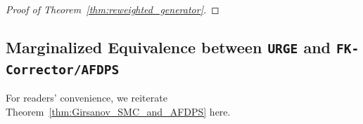 \documentclass{article}
\theoremstyle{plain}
\theoremstyle{definition}
\theoremstyle{remark}
\renewcommand{\P}{{\mathbb{P}}}
\begin{document}
\begin{proof}[Proof of Theorem~\ref{thm:reweighted_generator}]

\end{proof}

\subsection{Marginalized Equivalence between \texttt{URGE} and \texttt{FK-Corrector/AFDPS}}
\label{app:equivalence}

For readers' convenience, we reiterate Theorem~\ref{thm:Girsanov_SMC_and_AFDPS} here.
\end{document}
